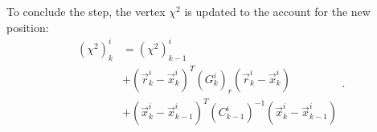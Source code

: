 To conclude the step, the vertex $\chi^2$ is updated to the account for the new position:
\begin{equation}
\begin{aligned}
	{(\chi^2)}_k^i &= {(\chi^2)}_{k-1}^i \\
	&+
	{\left(\vec{r}_{k}^i - \vec{x}_k^i\right)}^T  {(G_k^i)}_r \left(\vec{r}_{k}^i - \vec{x}_k^i \right) \\
	&+
	{\left(\vec{x}_k^i - \vec{x}_{k-1}^i\right)}^T  {(C_{k-1}^i)}^{-1} \left(\vec{x}_k^i - \vec{x}_{k-1}^i\right) \\
\end{aligned}.
\label{eq:VF_vertex_chi2_final}
\end{equation}


